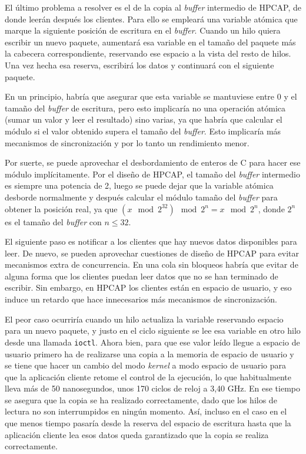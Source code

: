 \documentclass[oneside, draft]{epstfg}
\begin{document}
El último problema a resolver es el de la copia al \textit{buffer} intermedio de HPCAP, de donde leerán después los clientes. Para ello se empleará una variable atómica que marque la siguiente posición de escritura en el \textit{buffer}. Cuando un hilo quiera escribir un nuevo paquete, aumentará esa variable en el tamaño del paquete más la cabecera correspondiente, reservando ese espacio a la vista del resto de hilos. Una vez hecha esa reserva, escribirá los datos y continuará con el siguiente paquete.

En un principio, habría que asegurar que esta variable se mantuviese entre 0 y el tamaño del \textit{buffer} de escritura, pero esto implicaría no una operación atómica (sumar un valor y leer el resultado) sino varias, ya que habría que calcular el módulo si el valor obtenido supera el tamaño del \textit{buffer}. Esto implicaría más mecanismos de sincronización y por lo tanto un rendimiento menor.

Por suerte, se puede aprovechar el desbordamiento de enteros de C para hacer ese módulo implícitamente. Por el diseño de HPCAP, el tamaño del \textit{buffer} intermedio es siempre una potencia de 2, luego se puede dejar que la variable atómica desborde normalmente y después calcular el módulo tamaño del \textit{buffer} para obtener la posición real, ya que $(x \mod 2^{32}) \mod 2^n = x \mod 2^n$, donde $2^n$ es el tamaño del \textit{buffer} con $n ≤ 32$.

El siguiente paso es notificar a los clientes que hay nuevos datos disponibles para leer. De nuevo, se pueden aprovechar cuestiones de diseño de HPCAP para evitar mecanismos extra de concurrencia. En una cola sin bloqueos habría que evitar de alguna forma que los clientes puedan leer datos que no se han terminado de escribir. Sin embargo, en HPCAP los clientes están en espacio de usuario, y eso induce un retardo que hace innecesarios más mecanismos de sincronización.

El peor caso ocurriría cuando un hilo actualiza la variable reservando espacio para un nuevo paquete, y justo en el ciclo siguiente se lee esa variable en otro hilo desde una llamada \texttt{ioctl}. Ahora bien, para que ese valor leído llegue a espacio de usuario primero ha de realizarse una copia a la memoria de espacio de usuario y se tiene que hacer un cambio del modo \textit{kernel} a modo espacio de usuario para que la aplicación cliente retome el control de la ejecución, lo que habitualmente lleva más de 50 nanosegundos, unos 170 ciclos de reloj a 3,40 GHz. En ese tiempo se asegura que la copia se ha realizado correctamente, dado que los hilos de lectura no son interrumpidos en ningún momento. Así, incluso en el caso en el que menos tiempo pasaría desde la reserva del espacio de escritura hasta que la aplicación cliente lea esos datos queda garantizado que la copia se realiza correctamente.
\end{document}
